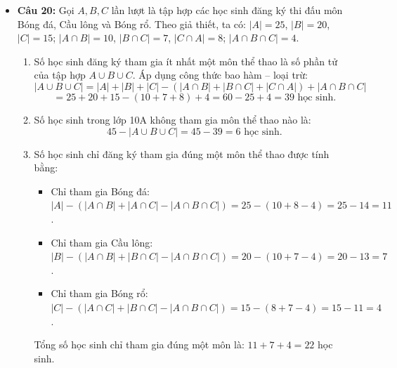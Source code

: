 \documentclass[12pt,a4paper]{article}
\begin{document}
\begin{itemize}[leftmargin=0.6cm, itemsep=6pt]
    \item \textbf{Câu 20:}
    Gọi $A, B, C$ lần lượt là tập hợp các học sinh đăng ký thi đấu môn Bóng đá, Cầu lông và Bóng rổ.
    Theo giả thiết, ta có:
    $|A| = 25$, $|B| = 20$, $|C| = 15$;
    $|A \cap B| = 10$, $|B \cap C| = 7$, $|C \cap A| = 8$;
    $|A \cap B \cap C| = 4$.
    \begin{enumerate}
        \item Số học sinh đăng ký tham gia ít nhất một môn thể thao là số phần tử của tập hợp $A \cup B \cup C$. Áp dụng công thức bao hàm -- loại trừ:
        \[
        |A \cup B \cup C| = |A| + |B| + |C| - (|A \cap B| + |B \cap C| + |C \cap A|) + |A \cap B \cap C|
        \]
        \[
        = 25 + 20 + 15 - (10 + 7 + 8) + 4 = 60 - 25 + 4 = 39\text{ học sinh}.
        \]
        \item Số học sinh trong lớp 10A không tham gia môn thể thao nào là:
        \[
        45 - |A \cup B \cup C| = 45 - 39 = 6\text{ học sinh}.
        \]
        \item Số học sinh chỉ đăng ký tham gia đúng một môn thể thao được tính bằng:
        \begin{itemize}
            \item Chỉ tham gia Bóng đá: $|A| - (|A \cap B| + |A \cap C| - |A \cap B \cap C|) = 25 - (10 + 8 - 4) = 25 - 14 = 11$.
            \item Chỉ tham gia Cầu lông: $|B| - (|A \cap B| + |B \cap C| - |A \cap B \cap C|) = 20 - (10 + 7 - 4) = 20 - 13 = 7$.
            \item Chỉ tham gia Bóng rổ: $|C| - (|A \cap C| + |B \cap C| - |A \cap B \cap C|) = 15 - (8 + 7 - 4) = 15 - 11 = 4$.
        \end{itemize}
        Tổng số học sinh chỉ tham gia đúng một môn là: $11 + 7 + 4 = 22$ học sinh.
    \end{enumerate}


\end{itemize}
\end{document}
